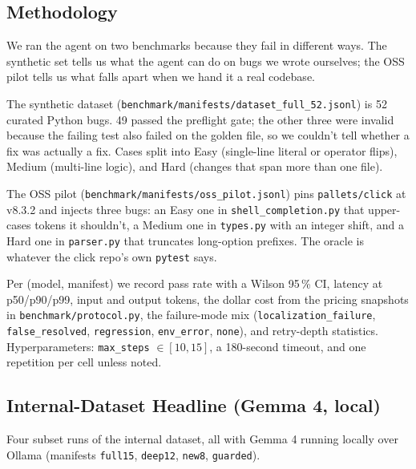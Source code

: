 \documentclass[11pt,letterpaper]{article}
\begin{document}
\subsection{Methodology}

We ran the agent on two benchmarks because they fail in different ways. The synthetic set tells us what the agent can do on bugs we wrote ourselves; the OSS pilot tells us what falls apart when we hand it a real codebase.

The synthetic dataset (\texttt{benchmark/manifests/dataset\_full\_52.jsonl}) is 52 curated Python bugs. 49 passed the preflight gate; the other three were invalid because the failing test also failed on the golden file, so we couldn't tell whether a fix was actually a fix. Cases split into Easy (single-line literal or operator flips), Medium (multi-line logic), and Hard (changes that span more than one file).

The OSS pilot (\texttt{benchmark/manifests/oss\_pilot.jsonl}) pins \texttt{pallets/click} at v8.3.2 and injects three bugs: an Easy one in \texttt{shell\_completion.py} that upper-cases tokens it shouldn't, a Medium one in \texttt{types.py} with an integer shift, and a Hard one in \texttt{parser.py} that truncates long-option prefixes. The oracle is whatever the click repo's own \texttt{pytest} says.

Per (model, manifest) we record pass rate with a Wilson 95\,\% CI, latency at p50/p90/p99, input and output tokens, the dollar cost from the pricing snapshots in \texttt{benchmark/protocol.py}, the failure-mode mix (\texttt{localization\_failure}, \texttt{false\_resolved}, \texttt{regression}, \texttt{env\_error}, \texttt{none}), and retry-depth statistics. Hyperparameters: \texttt{max\_steps} $\in [10,15]$, a 180-second timeout, and one repetition per cell unless noted.

\subsection{Internal-Dataset Headline (Gemma 4, local)}

Four subset runs of the internal dataset, all with Gemma 4 running locally over Ollama (manifests \texttt{full15}, \texttt{deep12}, \texttt{new8}, \texttt{guarded}).
\end{document}
